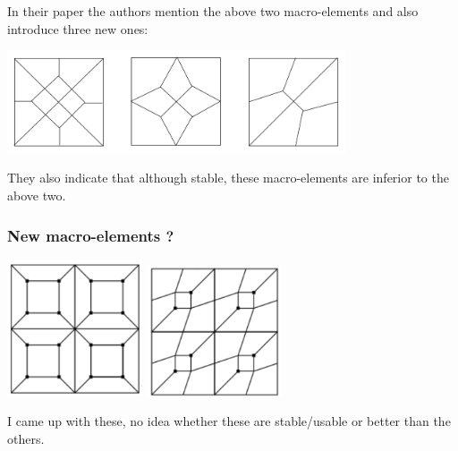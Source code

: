In their paper \cite{qizh07} the authors mention the above two macro-elements 
and also introduce three new ones:

\begin{center}
\includegraphics[width=10cm]{images/meshtopos/qizh07b}
\end{center}

They also indicate that although stable, these macro-elements are inferior 
to the above two. 

\subsubsection{New macro-elements ?}

\begin{center}
\includegraphics[width=4cm]{images/meshtopos/m21}
\includegraphics[width=4cm]{images/meshtopos/m22}
\end{center}

I came up with these, no idea whether these are stable/usable or better than the others.






 

